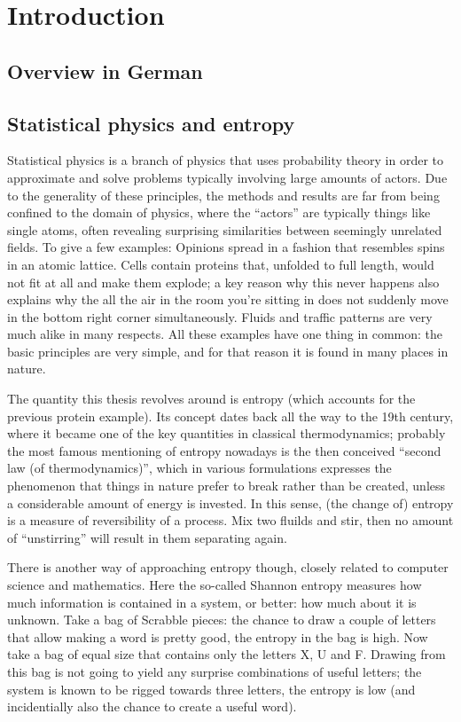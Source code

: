 \chapter{Introduction}


\section{Overview in German}




\section{Statistical physics and entropy}

Statistical physics is a branch of physics that uses probability theory in order to approximate and solve problems typically involving large amounts of actors. Due to the generality of these principles, the methods and results are far from being confined to the domain of physics, where the ``actors'' are typically things like single atoms, often revealing surprising similarities between seemingly unrelated fields. To give a few examples: Opinions spread in a fashion that resembles spins in an atomic lattice. Cells contain proteins that, unfolded to full length, would not fit at all and make them explode; a key reason why this never happens also explains why the all the air in the room you're sitting in does not suddenly move in the bottom right corner simultaneously. Fluids and traffic patterns are very much alike in many respects. All these examples have one thing in common: the basic principles are very simple, and for that reason it is found in many places in nature.

The quantity this thesis revolves around is entropy (which accounts for the previous protein example). Its concept dates back all the way to the 19th century, where it became one of the key quantities in classical thermodynamics; probably the most famous mentioning of entropy nowadays is the then conceived ``second law (of thermodynamics)'', which in various formulations expresses the phenomenon that things in nature prefer to break rather than be created, unless a considerable amount of energy is invested. In this sense, (the change of) entropy is a measure of reversibility of a process. Mix two fluilds and stir, then no amount of ``unstirring'' will result in them separating again.

There is another way of approaching entropy though, closely related to computer science and mathematics. Here the so-called Shannon entropy measures how much information is contained in a system, or better: how much about it is unknown. Take a bag of Scrabble pieces: the chance to draw a couple of letters that allow making a word is pretty good, the entropy in the bag is high. Now take a bag of equal size that contains only the letters X, U and F. Drawing from this bag is not going to yield any surprise combinations of useful letters; the system is known to be rigged towards three letters, the entropy is low (and incidentially also the chance to create a useful word).

